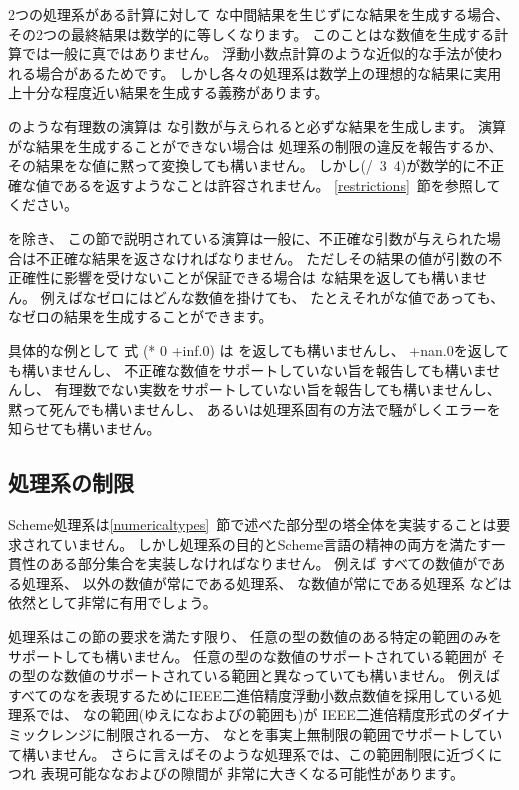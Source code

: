 \vest 2つの処理系がある計算に対して
な中間結果を生じずにな結果を生成する場合、
その2つの最終結果は数学的に等しくなります。
このことはな数値を生成する計算では一般に真ではありません。
浮動小数点計算のような近似的な手法が使われる場合があるためです。
しかし各々の処理系は数学上の理想的な結果に実用上十分な程度近い結果を生成する義務があります。

\vest {\cf +}のような有理数の演算は
な引数が与えられると必ずな結果を生成します。
演算がな結果を生成することができない場合は
処理系の制限の違反を報告するか、
その結果をな値に黙って変換しても構いません。
しかし{\cf (/~3~4)}が数学的に不正確な値である{}を返すようなことは許容されません。
\ref{restrictions}~節を参照してください。

\vest {}を除き、
この節で説明されている演算は一般に、不正確な引数が与えられた場合は不正確な結果を返さなければなりません。
ただしその結果の値が引数の不正確性に影響を受けないことが保証できる場合は
な結果を返しても構いません。
例えばなゼロにはどんな数値を掛けても、
たとえそれがな値であっても、
なゼロの結果を生成することができます。

具体的な例として
式 {\cf (* 0 +inf.0)} は
{}を返しても構いませんし、
{\cf +nan.0}を返しても構いませんし、
不正確な数値をサポートしていない旨を報告しても構いませんし、
有理数でない実数をサポートしていない旨を報告しても構いませんし、
黙って死んでも構いませんし、
あるいは処理系固有の方法で騒がしくエラーを知らせても構いません。

\subsection{処理系の制限}

\label{restrictions}

\vest Scheme処理系は\ref{numericaltypes}~節で述べた部分型の塔全体を実装することは要求されていません。
しかし処理系の目的とScheme言語の精神の両方を満たす一貫性のある部分集合を実装しなければなりません。
例えば
すべての数値がである処理系、
以外の数値が常にである処理系、
な数値が常にである処理系
などは依然として非常に有用でしょう。

\vest 処理系はこの節の要求を満たす限り、
任意の型の数値のある特定の範囲のみをサポートしても構いません。
任意の型のな数値のサポートされている範囲が
その型のな数値のサポートされている範囲と異なっていても構いません。
例えば
すべてのなを表現するためにIEEE二進倍精度浮動小数点数値を採用している処理系では、
なの範囲(ゆえになおよびの範囲も)が
IEEE二進倍精度形式のダイナミックレンジに制限される一方、
なとを事実上無制限の範囲でサポートしていて構いません。
さらに言えばそのような処理系では、この範囲制限に近づくにつれ
表現可能ななおよびの隙間が
非常に大きくなる可能性があります。

